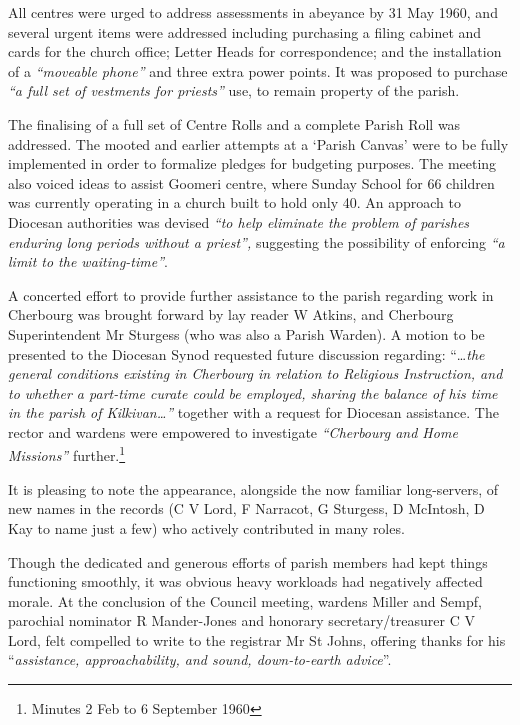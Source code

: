 All centres were urged to address assessments in abeyance by 31 May 1960, and several urgent items were addressed including purchasing a filing cabinet and cards for the church office; Letter Heads for correspondence; and the installation of a \emph{``moveable phone''} and three extra power points. It was proposed to purchase \emph{``a full set of vestments for priests''} use, to remain property of the parish.



The finalising of a full set of Centre Rolls and a complete Parish Roll was addressed. The mooted and earlier attempts at a `Parish Canvas' were to be fully implemented in order to formalize pledges for budgeting purposes. The meeting also voiced ideas to assist Goomeri centre, where Sunday School for 66 children was currently operating in a church built to hold only 40. An approach to Diocesan authorities was devised \emph{``to help eliminate the problem of parishes enduring long periods without a priest'',} suggesting the possibility of enforcing \emph{``a limit to the waiting-time''}.



A concerted effort to provide further assistance to the parish regarding work in Cherbourg was brought forward by lay reader W Atkins, and Cherbourg Superintendent Mr Sturgess (who was also a Parish Warden). A motion to be presented to the Diocesan Synod requested future discussion regarding: ``\ldots{}\emph{the general conditions existing in Cherbourg in relation to Religious Instruction, and to whether a part-time curate could be employed, sharing the balance of his time in the parish of Kilkivan\ldots''} together with a request for Diocesan assistance. The rector and wardens were empowered to investigate \emph{``Cherbourg and Home Missions''} further.\footnote{Minutes 2 Feb to 6 September 1960}


It is pleasing to note the appearance, alongside the now familiar long-servers, of new names in the records (C V Lord, F Narracot, G Sturgess, D McIntosh, D Kay to name just a few) who actively contributed in many roles.



Though the dedicated and generous efforts of parish members had kept things functioning smoothly, it was obvious heavy workloads had negatively affected morale. At the conclusion of the Council meeting, wardens Miller and Sempf, parochial nominator R Mander-Jones and honorary secretary/treasurer C V Lord, felt compelled to write to the registrar Mr St Johns, offering thanks for his ``\emph{assistance, approachability, and sound, down-to-earth advice}''.



